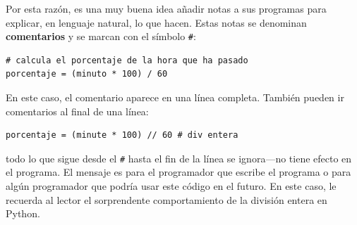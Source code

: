 Por esta razón, es una muy buena idea añadir notas a sus programas
para explicar, en lenguaje natural, lo que hacen. Estas notas se denominan
\textbf{comentarios }y se marcan con el símbolo \texttt{\#}:

\begin{verbatim}
# calcula el porcentaje de la hora que ha pasado
porcentaje = (minuto * 100) / 60
\end{verbatim}
En este caso, el comentario aparece en una línea completa. También
pueden ir comentarios al final de una línea:

\begin{verbatim}
porcentaje = (minute * 100) // 60 # div entera
\end{verbatim}

todo lo que sigue desde el \texttt{\#} hasta el fin de la línea se
ignora—no tiene efecto en el programa. El mensaje es para el programador
que escribe el programa o para algún programador que podría usar este
código en el futuro. En este caso, le recuerda al lector el sorprendente
comportamiento de la división entera en Python.

